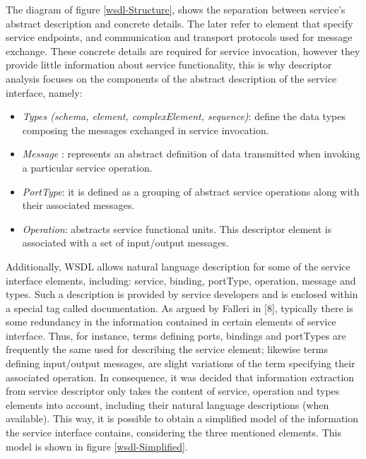 The diagram of figure \ref{wsdl-Structure}, shows the separation between service’s abstract description and concrete details. The later refer to element that specify service endpoints, and communication and transport protocols used for message exchange. These concrete details are required for service invocation, however they provide little information about service functionality, this is why descriptor analysis focuses on the components of the abstract description of the service interface, namely:

\begin{itemize}
 \item \textit{Types (schema, element, complexElement, sequence)}: define the data types composing the messages exchanged in service invocation.
 \item \textit{Message} : represents an abstract definition of data transmitted when invoking a particular service operation.
 \item \textit{PortType}: it is defined as a grouping of abstract service operations along with their associated messages.
 \item \textit{Operation}: abstracts service functional units. This descriptor element is associated with a set of input/output messages.
\end{itemize}

Additionally, WSDL allows natural language description for some of the service interface elements, including: service, binding, portType, operation, message and types. Such a description is provided by service developers and is enclosed within a special tag called documentation. As argued by Falleri in [8], typically there is some redundancy in the information contained in certain elements of service interface. Thus, for instance, terms defining ports, bindings and portTypes are frequently the same used for describing the service element; likewise terms defining input/output messages, are slight variations of the term specifying their associated operation. In consequence, it was decided that information extraction from service descriptor only takes the content of service, operation and types elements into account, including their natural language descriptions (when available). This way, it is possible to obtain a simplified model of the information the service interface contains, considering the three 
mentioned elements. This model is shown in figure \ref{wsdl-Simplified}.

